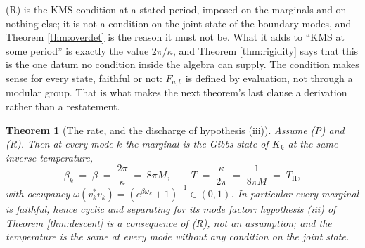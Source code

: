 \documentclass[11pt]{article}
\newtheorem{theorem}{Theorem}[section]
\theoremstyle{definition}
\renewcommand{\TH}{T_{\mathrm{H}}} %
\begin{document}
(R) is the KMS condition at a stated period, imposed on the marginals and on nothing else; it is not a condition on the joint state of the boundary modes, and Theorem \ref{thm:overdet} is the reason it must not be. What it adds to ``KMS at some period'' is exactly the value $2\pi/\kappa$, and Theorem \ref{thm:rigidity} says that this is the one datum no condition inside the algebra can supply. The condition makes sense for every state, faithful or not: $F_{a,b}$ is defined by evaluation, not through a modular group. That is what makes the next theorem's last clause a derivation rather than a restatement.

\begin{theorem}[The rate, and the discharge of hypothesis (iii)]\label{thm:rate}
Assume (P) and (R). Then at every mode $k$ the marginal is the Gibbs state of $K_k$ at the same inverse temperature,
\[
\beta_k \;=\; \beta \;=\; \frac{2\pi}{\kappa} \;=\; 8\pi M , \qquad T \;=\; \frac{\kappa}{2\pi} \;=\; \frac{1}{8\pi M} \;=\; \TH ,
\]
with occupancy $\omega(v_k^{*}v_k) = (e^{\beta\omega_k} + 1)^{-1} \in (0,1)$. In particular every marginal is faithful, hence cyclic and separating for its mode factor: hypothesis (iii) of Theorem \ref{thm:descent} is a consequence of (R), not an assumption; and the temperature is the same at every mode without any condition on the joint state.
\end{theorem}
\end{document}
